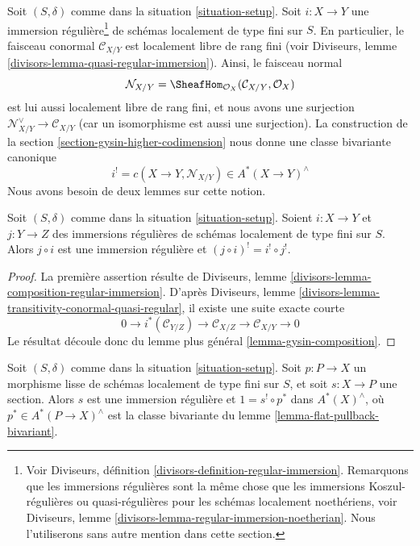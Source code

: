 \medskip\noindent
Soit $(S, \delta)$ comme dans la situation \ref{situation-setup}.
Soit $i : X \to Y$ une
immersion régulière\footnote{Voir
Diviseurs, définition \ref{divisors-definition-regular-immersion}.
Remarquons que les immersions régulières sont la même chose que les
immersions Koszul-régulières ou quasi-régulières
pour les schémas localement noethériens, voir
Diviseurs, lemme \ref{divisors-lemma-regular-immersion-noetherian}.
Nous l'utiliserons sans autre mention dans cette section.}
de schémas localement de type fini sur $S$.
En particulier, le faisceau conormal $\mathcal{C}_{X/Y}$ est localement libre de rang fini
(voir Diviseurs, lemme \ref{divisors-lemma-quasi-regular-immersion}). Ainsi, le
faisceau normal
$$
\mathcal{N}_{X/Y} = \SheafHom_{\mathcal{O}_X}(\mathcal{C}_{X/Y}, \mathcal{O}_X)
$$
est lui aussi localement libre de rang fini, et nous avons une surjection
$\mathcal{N}_{X/Y}^\vee \to \mathcal{C}_{X/Y}$ (car un isomorphisme
est aussi une surjection).
La construction de la section \ref{section-gysin-higher-codimension}
nous donne une classe bivariante canonique
$$
i^! = c(X \to Y, \mathcal{N}_{X/Y}) \in A^*(X \to Y)^\wedge
$$
Nous avons besoin de deux lemmes sur cette notion.

\begin{lemma}
\label{lemma-composition-regular-immersion}
Soit $(S, \delta)$ comme dans la situation \ref{situation-setup}.
Soient $i : X \to Y$ et $j : Y \to Z$ des immersions régulières
de schémas localement de type fini sur $S$. Alors
$j \circ i$ est une immersion régulière et
$(j \circ i)^! = i^! \circ j^!$.
\end{lemma}

\begin{proof}
La première assertion résulte de
Diviseurs, lemme \ref{divisors-lemma-composition-regular-immersion}.
D'après Diviseurs, lemme \ref{divisors-lemma-transitivity-conormal-quasi-regular},
il existe une suite exacte courte
$$
0 \to
i^*(\mathcal{C}_{Y/Z}) \to
\mathcal{C}_{X/Z} \to
\mathcal{C}_{X/Y} \to 0
$$
Le résultat découle donc du lemme plus général \ref{lemma-gysin-composition}.
\end{proof}

\begin{lemma}
\label{lemma-section-smooth}
Soit $(S, \delta)$ comme dans la situation \ref{situation-setup}.
Soit $p : P \to X$ un morphisme lisse de schémas localement de type fini
sur $S$, et soit $s : X \to P$ une section. Alors $s$ est une
immersion régulière et $1 = s^! \circ p^*$ dans $A^*(X)^\wedge$,
où $p^* \in A^*(P \to X)^\wedge$ est la classe bivariante
du lemme \ref{lemma-flat-pullback-bivariant}.
\end{lemma}

